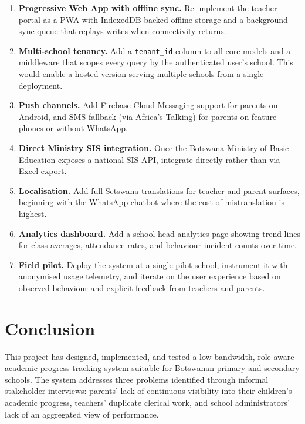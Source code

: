 \documentclass[11pt,a4paper]{article}
\begin{document}
\begin{enumerate}[leftmargin=*]
    \item \textbf{Progressive Web App with offline sync.} Re-implement
    the teacher portal as a PWA with IndexedDB-backed offline storage and
    a background sync queue that replays writes when connectivity returns.

    \item \textbf{Multi-school tenancy.} Add a \texttt{tenant\_id} column
    to all core models and a middleware that scopes every query by the
    authenticated user's school. This would enable a hosted version
    serving multiple schools from a single deployment.

    \item \textbf{Push channels.} Add Firebase Cloud Messaging support
    for parents on Android, and SMS fallback (via Africa's Talking) for
    parents on feature phones or without WhatsApp.

    \item \textbf{Direct Ministry SIS integration.} Once the Botswana
    Ministry of Basic Education exposes a national SIS API, integrate
    directly rather than via Excel export.

    \item \textbf{Localisation.} Add full Setswana translations for
    teacher and parent surfaces, beginning with the WhatsApp chatbot
    where the cost-of-mistranslation is highest.

    \item \textbf{Analytics dashboard.} Add a school-head analytics page
    showing trend lines for class averages, attendance rates, and
    behaviour incident counts over time.

    \item \textbf{Field pilot.} Deploy the system at a single pilot
    school, instrument it with anonymised usage telemetry, and iterate
    on the user experience based on observed behaviour and explicit
    feedback from teachers and parents.
\end{enumerate}

\section{Conclusion}

This project has designed, implemented, and tested a low-bandwidth, role-aware
academic progress-tracking system suitable for Botswanan primary and
secondary schools. The system addresses three problems identified through
informal stakeholder interviews: parents' lack of continuous visibility into
their children's academic progress, teachers' duplicate clerical work, and
school administrators' lack of an aggregated view of performance.
\end{document}
